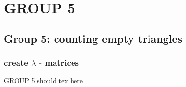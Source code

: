 
\section{GROUP 5}
\subsection{Group 5: counting empty triangles}
\begin{frame}
\frametitle{create $\lambda$ - matrices}
GROUP 5 should tex here
\end{frame}

